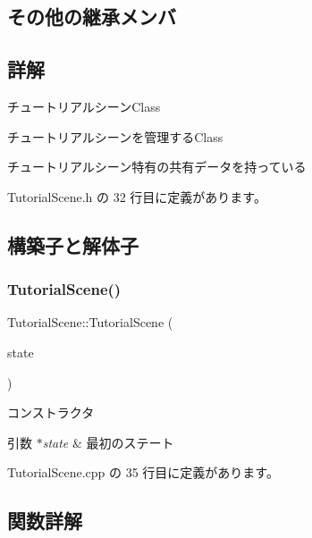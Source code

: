 \subsection*{その他の継承メンバ}


\subsection{詳解}
チュートリアルシーン\+Class 

チュートリアルシーンを管理する\+Class

チュートリアルシーン特有の共有データを持っている 

 Tutorial\+Scene.\+h の 32 行目に定義があります。



\subsection{構築子と解体子}
\mbox{\label{class_tutorial_scene_a90f8c010bd72aa3dae61a5294fdfbeb7}} 
\subsubsection{\texorpdfstring{Tutorial\+Scene()}{TutorialScene()}}
{\footnotesize\ttfamily Tutorial\+Scene\+::\+Tutorial\+Scene (\begin{DoxyParamCaption}\item[{\mbox{\hyperlink{class_scene_base_1_1_state_base}{State\+Base}} $\ast$}]{state }\end{DoxyParamCaption})}



コンストラクタ 


\begin{DoxyParams}{引数}
{\em $\ast$state} & 最初のステート \\
\hline
\end{DoxyParams}


 Tutorial\+Scene.\+cpp の 35 行目に定義があります。



\subsection{関数詳解}
\mbox{\label{class_tutorial_scene_a9f1a224f8864ccd5ddfe5a8c894a4582}} 
